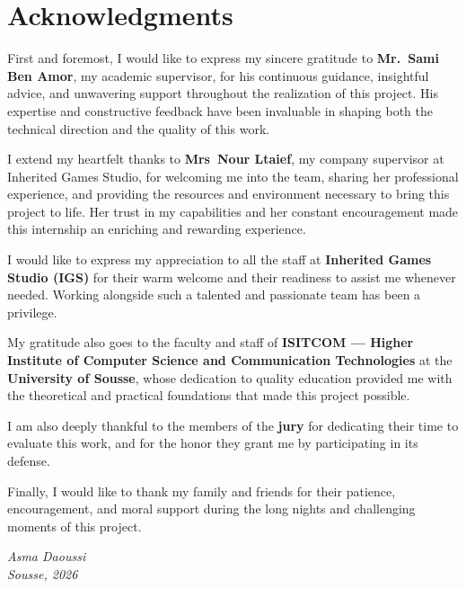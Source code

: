 \chapter*{Acknowledgments}
\thispagestyle{empty}

\vspace*{1cm}

First and foremost, I would like to express my sincere gratitude to \textbf{Mr.~Sami Ben Amor}, my academic supervisor, for his continuous guidance, insightful advice, and unwavering support throughout the realization of this project. His expertise and constructive feedback have been invaluable in shaping both the technical direction and the quality of this work.

I extend my heartfelt thanks to \textbf{Mrs~Nour Ltaief}, my company supervisor at Inherited Games Studio, for welcoming me into the team, sharing her professional experience, and providing the resources and environment necessary to bring this project to life. Her trust in my capabilities and her constant encouragement made this internship an enriching and rewarding experience.

I would like to express my appreciation to all the staff at \textbf{Inherited Games Studio (IGS)} for their warm welcome and their readiness to assist me whenever needed. Working alongside such a talented and passionate team has been a privilege.

My gratitude also goes to the faculty and staff of \textbf{ISITCOM — Higher Institute of Computer Science and Communication Technologies} at the \textbf{University of Sousse}, whose dedication to quality education provided me with the theoretical and practical foundations that made this project possible.

I am also deeply thankful to the members of the \textbf{jury} for dedicating their time to evaluate this work, and for the honor they grant me by participating in its defense.

Finally, I would like to thank my family and friends for their patience, encouragement, and moral support during the long nights and challenging moments of this project.

\vspace{1cm}

\begin{flushright}
\textit{Asma Daoussi}\\
\textit{Sousse, 2026}
\end{flushright}
